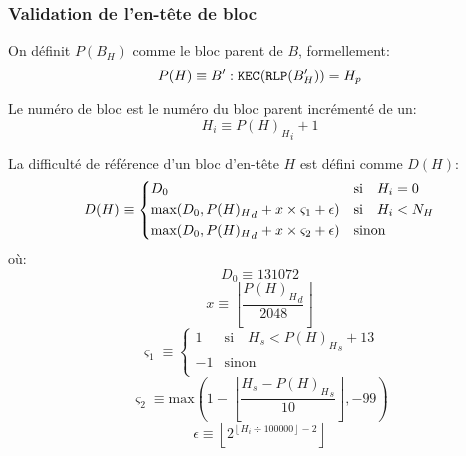 \documentclass[9pt,oneside]{amsart}
\newcommand{\firsthomesteadblock}{\ensuremath{N_H}}
\begin{document}
\begin{multicols}{2}
\subsubsection{Validation de l'en-tête de bloc}

On définit $P(B_H)$ comme le bloc parent de $B$, formellement:
\begin{equation}
P(H) \equiv B': \mathtt{\tiny KEC}(\mathtt{\tiny RLP}(B'_H)) = H_p
\end{equation}

Le numéro de bloc est le numéro du bloc parent incrémenté de un:
\begin{equation}
H_i \equiv {{P(H)_H}_i} + 1
\end{equation}

\newcommand{\mindifficulty}{D_0}
\newcommand{\frontiermod}{\ensuremath{\varsigma_1}}
\newcommand{\homesteadmod}{\ensuremath{\varsigma_2}}
\newcommand{\expdiffsymb}{\ensuremath{\epsilon}}
\newcommand{\diffadjustment}{x}

La difficulté de référence d'un bloc d'en-tête $H$ est défini comme $D(H)$:
\begin{equation}
D(H) \equiv \begin{dcases}
\mindifficulty & \text{si} \quad H_i = 0\\
\text{max}\!\left(\mindifficulty, {P(H)_H}_d + \diffadjustment\times\frontiermod + \expdiffsymb \right) & \text{si} \quad H_i<\firsthomesteadblock\\
\text{max}\!\left(\mindifficulty, {P(H)_H}_d + \diffadjustment\times\homesteadmod + \expdiffsymb \right) & \text{sinon}\\
\end{dcases}
\end{equation}
où:
\begin{equation}
\mindifficulty \equiv 131072
\end{equation}
\begin{equation}
\diffadjustment \equiv \left\lfloor\frac{{P(H)_H}_d}{2048}\right\rfloor
\end{equation}
\begin{equation}
\frontiermod \equiv \begin{cases}
1 & \text{si} \quad H_s < {P(H)_H}_s + 13 \\
-1 & \text{sinon} \\
\end{cases}
\end{equation}
\begin{equation}
\homesteadmod \equiv \text{max}\left( 1 - \left\lfloor\frac{H_s - {P(H)_H}_s}{10}\right\rfloor, -99 \right)
\end{equation}
\begin{equation}
\expdiffsymb \equiv \left\lfloor 2^{ \left\lfloor H_i \div 100000 \right\rfloor - 2 } \right\rfloor
\end{equation}


\end{multicols}
\end{document}
